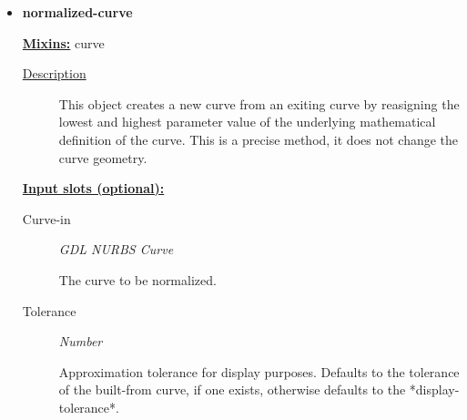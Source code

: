 \documentclass [11pt]{book}
\begin{document}
\begin{itemize}







\item {}
\label{prim:normalized-curve}
\textbf{normalized-curve}


\textbf{
\underline{Mixins:}} curve





\begin{description}

\item [
\underline{Description}]


This object creates a new curve from an exiting 
curve by  reasigning the lowest and highest parameter value of the underlying 
mathematical definition of the curve. This is a precise method, it does not 
change the curve geometry.



\end{description}








\textbf{
\underline{Input slots (optional):}}

\begin{description}

\item [Curve-in]
\emph{GDL NURBS Curve}

 The curve to be normalized.




\item [Tolerance]
\emph{Number}

 Approximation tolerance for display purposes. Defaults to the tolerance of the
built-from curve, if one exists, otherwise defaults to the *display-tolerance*.





\end{description}
\end{itemize}
\end{document}

